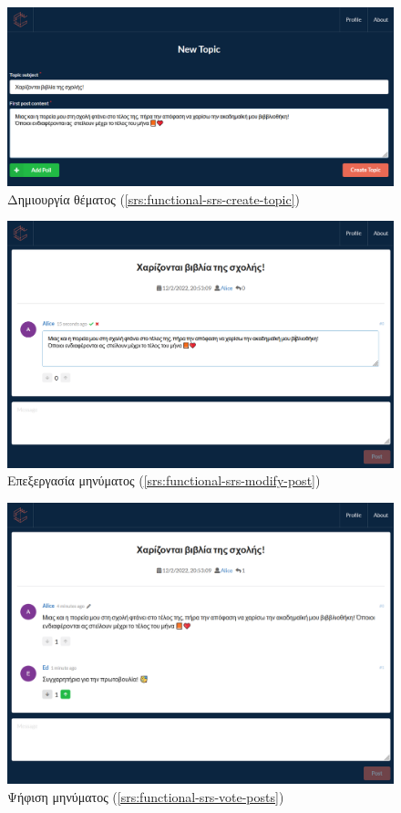 \vspace{2\baselineskip}

\begin{figure}[H]
	\centering
	\includegraphics[width=\textwidth]{assets/figures/appendix-a/screenshot-3-topic-creation}
	\caption{Δημιουργία θέματος (\ref{srs:functional-srs-create-topic})}
\end{figure}

\begin{figure}[H]
	\centering
	\includegraphics[width=.9\textwidth]{assets/figures/appendix-a/screenshot-4-post-editing}
	\caption{Επεξεργασία μηνύματος (\ref{srs:functional-srs-modify-post})}
\end{figure}

\begin{figure}[H]
	\centering
	\includegraphics[width=.9\textwidth]{assets/figures/appendix-a/screenshot-5-post-voting}
	\caption{Ψήφιση μηνύματος (\ref{srs:functional-srs-vote-posts})}
\end{figure}

